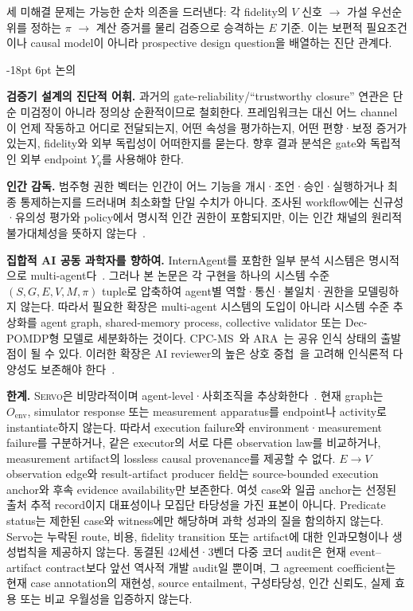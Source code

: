 \documentclass[11pt]{article}
\makeatletter
\renewcommand\section{\@startsection{section}{1}{\z@}%
  {-18pt \@plus -4pt \@minus -2pt}%
  {6pt \@plus 2pt}%
  {\normalfont\large\bfseries}}
\newcommand{\framework}{\textsc{Servo}}
\makeatother
\begin{document}
\noindent 세 미해결 문제는 가능한 순차 의존을 드러낸다: 각 fidelity의 $V$ 신호 $\rightarrow$ 가설 우선순위를 정하는 $\pi$ $\rightarrow$ 계산 증거를 물리 검증으로 승격하는 $E$ 기준. 이는 보편적 필요조건이나 causal model이 아니라 prospective design question을 배열하는 진단 관계다.

\section{논의}
\label{sec:discussion}

\textbf{검증기 설계의 진단적 어휘.} 과거의 gate-reliability/``trustworthy closure'' 연관은 단순 미검정이 아니라 정의상 순환적이므로 철회한다. 프레임워크는 대신 어느 channel이 언제 작동하고 어디로 전달되는지, 어떤 속성을 평가하는지, 어떤 편향·보정 증거가 있는지, fidelity와 외부 독립성이 어떠한지를 묻는다. 향후 결과 분석은 gate와 독립적인 외부 endpoint $Y_q$를 사용해야 한다.

\textbf{인간 감독.} 범주형 권한 벡터는 인간이 어느 기능을 개시·조언·승인·실행하거나 최종 통제하는지를 드러내며 최소화할 단일 수치가 아니다. 조사된 workflow에는 신규성·유의성 평가와 policy에서 명시적 인간 권한이 포함되지만, 이는 인간 채널의 원리적 불가대체성을 뜻하지 않는다~\citep{parasuraman2000automation}.

\textbf{집합적 AI 공동 과학자를 향하여.} InternAgent를 포함한 일부 분석 시스템은 명시적으로 multi-agent다~\citep{zhang2025novelseek}. 그러나 본 논문은 각 구현을 하나의 시스템 수준 $(S,G,E,V,M,\pi)$ tuple로 압축하여 agent별 역할·통신·불일치·권한을 모델링하지 않는다. 따라서 필요한 확장은 multi-agent 시스템의 도입이 아니라 시스템 수준 추상화를 agent graph, shared-memory process, collective validator 또는 Dec-POMDP형 모델로 세분화하는 것이다. CPC-MS~\citep{taniguchi2024cpc}와 ARA~\citep{liu2026lasthuman}는 공유 인식 상태의 출발점이 될 수 있다. 이러한 확장은 AI reviewer의 높은 상호 중첩~\citep{kim2026aireviewers}을 고려해 인식론적 다양성도 보존해야 한다~\citep{zollman2010epistemic}.

\textbf{한계.} \framework{}은 비망라적이며 agent-level·사회조직을 추상화한다~\citep{taniguchi2024cpc}. 현재 graph는 $O_{\mathrm{env}}$, simulator response 또는 measurement apparatus를 endpoint나 activity로 instantiate하지 않는다. 따라서 execution failure와 environment·measurement failure를 구분하거나, 같은 executor의 서로 다른 observation law를 비교하거나, measurement artifact의 lossless causal provenance를 제공할 수 없다. $E\rightarrow V$ observation edge와 result-artifact producer field는 source-bounded execution anchor와 후속 evidence availability만 보존한다. 여섯 case와 일곱 anchor는 선정된 출처 추적 record이지 대표성이나 모집단 타당성을 가진 표본이 아니다. Predicate status는 제한된 case와 witness에만 해당하며 과학 성과의 질을 함의하지 않는다. Servo는 누락된 route, 비용, fidelity transition 또는 artifact에 대한 인과모형이나 생성법칙을 제공하지 않는다. 동결된 42세션·3벤더 다중 코더 audit은 현재 event--artifact contract보다 앞선 역사적 개발 audit일 뿐이며, 그 agreement coefficient는 현재 case annotation의 재현성, source entailment, 구성타당성, 인간 신뢰도, 실제 효용 또는 비교 우월성을 입증하지 않는다.
\end{document}
